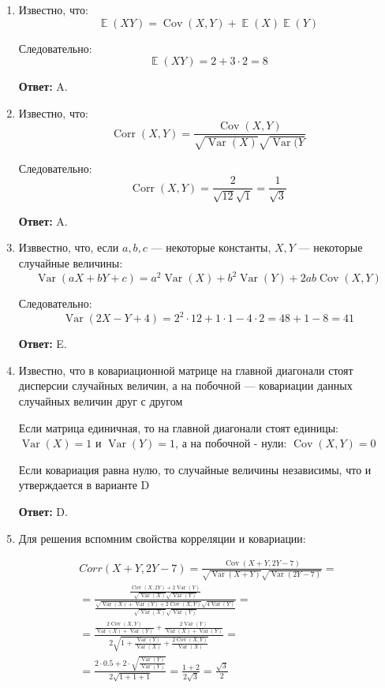 \documentclass[a4paper]{article} %
\DeclareMathOperator{\Var}{Var}
\DeclareMathOperator{\Cov}{Cov}
\DeclareMathOperator{\Corr}{Corr}
\DeclareMathOperator{\E}{\mathbb{E}}
\begin{document}
\begin{enumerate}
    
    \item
    Известно, что:
    \[
    \E(XY) = \Cov(X,Y) + \E(X)\E(Y)
    \]
    
    Следовательно:
    \[
    \E(XY) = 2 + 3\cdot2 = 8
    \]
    
    \textbf{Ответ:} A.
    
    
    \item 
    Известно, что:
    \[
    \Corr(X,Y) = \frac{\Cov(X,Y)}{\sqrt{\Var(X)}\sqrt{\Var(Y}}
    \]
    
    Следовательно:
    \[
    \Corr(X,Y) = \frac{2}{\sqrt{12}\sqrt{1}} = \frac{1}{\sqrt{3}}
    \]
    
    \textbf{Ответ:} A.
    
    
    \item
    Изввестно, что, если $a, b, c$ — некоторые константы, $X, Y$ — некоторые случайные величины:
    \[
    \Var(aX + bY + c) = a^2 \Var(X) + b^2 \Var(Y) + 2ab\Cov(X,Y)
    \]
    
    Следовательно:
    \[
    \Var(2X - Y + 4) = 2^2 \cdot 12 + 1 \cdot 1 - 4 \cdot 2 = 48 + 1 - 8 = 41
    \]
    
    \textbf{Ответ:} E.
    
    
    \item
    Известно, что в ковариационной матрице на главной диагонали стоят дисперсии случайных величин, а на побочной — ковариации данных случайных величин друг с другом
    
    Если матрица единичная, то на главной диагонали стоят единицы: $\Var(X) = 1$ и $\Var(Y) = 1$, а на побочной - нули:  $\Cov(X,Y) = 0$
    
    Если ковариация равна нулю, то случайные величины независимы, что и утверждается в варианте D
    
    \textbf{Ответ:} D.
    

    \item
    Для решения вспомним свойства корреляции и ковариации:
    
    \[
    \begin{gathered} Corr(X+Y, 2Y-7) = \frac{\Cov(X+Y, 2Y-7)}{\sqrt{\Var(X+Y)}\sqrt{\Var(2Y-7)}} = \\ 
    =\frac{\frac{\Cov(X, 2Y) + 2 \Var(Y)}{\sqrt{\Var(X)}\sqrt{\Var(Y)}}}{\frac{\sqrt{\Var(X) + \Var(Y) + 2\Cov(X,Y)}\sqrt{4\Var(Y)}}{\sqrt{\Var(X)}\sqrt{\Var(Y)}}} = \\ 
    =\frac{\frac{2\Cov(X, Y)}{\Var(X) + \Var(Y)} + \frac{2 \Var(Y)}{\Var(X) + \Var(Y)}}{2\sqrt{1 + \frac{\Var(Y)}{\Var(X)} + \frac{2\Cov(X,Y)}{\Var(X)}}} = \\ 
    =\frac{2 \cdot 0.5 + 2 \cdot \sqrt{\frac{\Var(Y)}{\Var(Y)}}}{2\sqrt{1 + 1 + 1}} = \frac{1 + 2}{2 \sqrt{3}} = \frac{\sqrt{3}}{2} \end{gathered} 
    \]
    

\end{enumerate}
\end{document}
